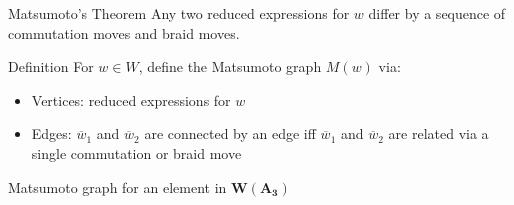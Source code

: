 \documentclass[final]{beamer}
\newcommand{\w}{\overline{w}}
\begin{document}
\begin{frame}{}
\begin{columns}[T]
\begin{column}{.33\linewidth}
\begin{block}{Matsumoto's Theorem}
Any two reduced expressions for $w$ differ by a sequence of commutation moves and braid moves.
\end{block}


\begin{block}{Definition}
For $w\in W$, define the \alert{Matsumoto graph} $M(w)$ via:
\begin{itemize}
\item Vertices: reduced expressions for $w$
\item Edges: $\w_1$ and $\w_2$ are connected by an edge iff $\w_1$ and $\w_2$ are related via a single commutation or braid move
\end{itemize}
\end{block}


\begin{block}{Matsumoto graph for an element in $\mathbf{W(A_3)}$}%



\end{block}
\end{column}
\end{columns}
\end{frame}
\end{document}
